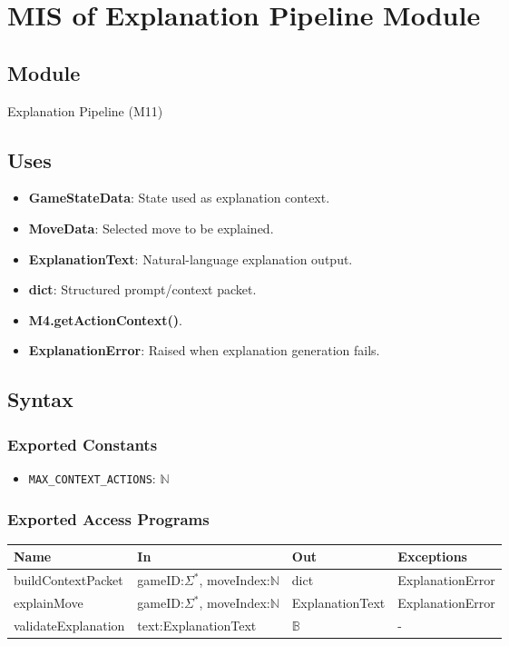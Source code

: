 \documentclass[12pt, titlepage]{article}
\begin{document}
\section{MIS of Explanation Pipeline Module} \label{M11}

\subsection{Module}
Explanation Pipeline (M11)

\subsection{Uses}
\begin{itemize}
    \item \textbf{GameStateData}: State used as explanation context.
    \item \textbf{MoveData}: Selected move to be explained.
    \item \textbf{ExplanationText}: Natural-language explanation output.
    \item \textbf{dict}: Structured prompt/context packet.
    \item \textbf{M4.getActionContext()}.
    \item \textbf{ExplanationError}: Raised when explanation generation fails.
\end{itemize}

\subsection{Syntax}

\subsubsection{Exported Constants}
\begin{itemize}
\item \texttt{MAX\_CONTEXT\_ACTIONS}: $\mathbb{N}$
\end{itemize}

\subsubsection{Exported Access Programs}
\begin{center}
\begin{tabular}{p{5cm} p{4cm} p{4cm} p{3cm}}
\hline
\textbf{Name} & \textbf{In} & \textbf{Out} & \textbf{Exceptions} \\
\hline
buildContextPacket & gameID:$\Sigma^*$, moveIndex:$\mathbb{N}$ & dict & ExplanationError \\
explainMove & gameID:$\Sigma^*$, moveIndex:$\mathbb{N}$ & ExplanationText & ExplanationError \\
validateExplanation & text:ExplanationText & $\mathbb{B}$ & - \\
\hline
\end{tabular}
\end{center}
\end{document}
